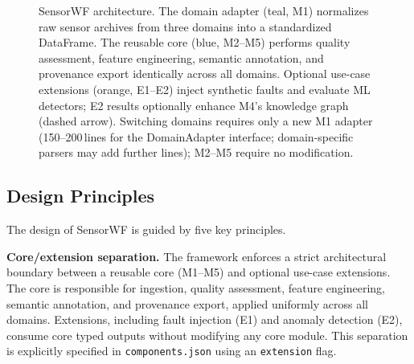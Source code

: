 \documentclass[conference]{IEEEtran}
\begin{document}
\begin{figure}[t]
\caption{SensorWF architecture. The domain adapter (teal, M1) normalizes raw sensor archives from three domains into a standardized DataFrame. The reusable core (blue, M2--M5) performs quality assessment, feature engineering, semantic annotation, and provenance export identically across all domains. Optional use-case extensions (orange, E1--E2) inject synthetic faults and evaluate ML detectors; E2 results optionally enhance M4's knowledge graph (dashed arrow). Switching domains requires only a new M1 adapter (150--200\,lines for the DomainAdapter interface; domain-specific parsers may add further lines); M2--M5 require no modification.}
\label{fig:architecture}
\end{figure}

\subsection{Design Principles}

The design of SensorWF is guided by five key principles.

\textbf{Core/extension separation.} The framework enforces a strict architectural boundary between a reusable core (M1--M5) and optional use-case extensions. The core is responsible for ingestion, quality assessment, feature engineering, semantic annotation, and provenance export, applied uniformly across all domains. Extensions, including fault injection (E1) and anomaly detection (E2), consume core typed outputs without modifying any core module. This separation is explicitly specified in \texttt{components.json} using an \texttt{extension} flag.
\end{document}
